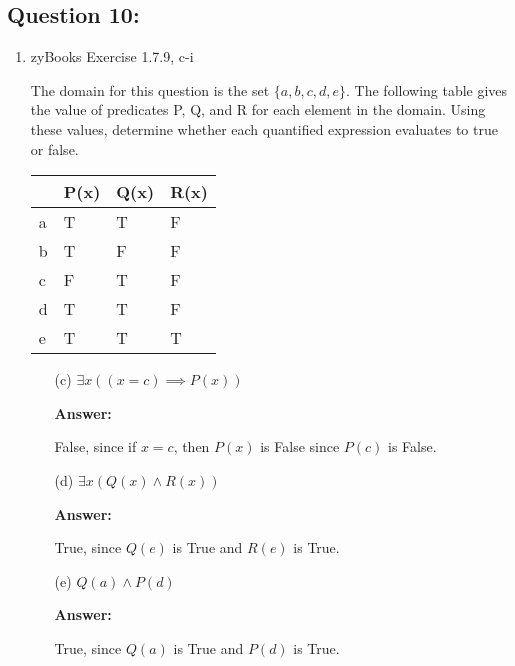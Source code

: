 \documentclass[12pt]{extreport}
\newcommand{\answer}[0]{\medskip \textbf{Answer:} \medskip}
\begin{document}
\subsection*{Question 10:}

\begin{enumerate}
    
    \item zyBooks Exercise 1.7.9, c-i
    
    The domain for this question is the set \( \{ a, b, c, d, e \} \). The following table gives the value of predicates P, Q, and R for each element in the domain. Using these values, determine whether each quantified expression evaluates to true or false.

    \begin{center}
        \begin{tabular}{|l|l|l|l|}
            \hline
            & P(x) & Q(x) & R(x) \\ \hline
            a & T & T & F \\ \hline
            b & T & F & F \\ \hline
            c & F & T & F \\ \hline
            d & T & T & F \\ \hline
            e & T & T & T \\ \hline
        \end{tabular}
    \end{center}
    
        \begin{enumerate}

            \item[(c)] \( \exists x((x = c) \implies P(x)) \) 
            
                \answer

                False, since if \( x = c \), then \( P(x) \) is False since \( P(c) \) is False.

            \item[(d)] \( \exists x (Q(x) \land R(x)) \)
            
                \answer

                True, since \( Q(e) \) is True and \( R(e) \) is True.

            \item[(e)] \( Q(a) \land P(d) \)
            
                \answer

                True, since \( Q(a) \) is True and \( P(d) \) is True.


\end{enumerate}
\end{enumerate}
\end{document}
